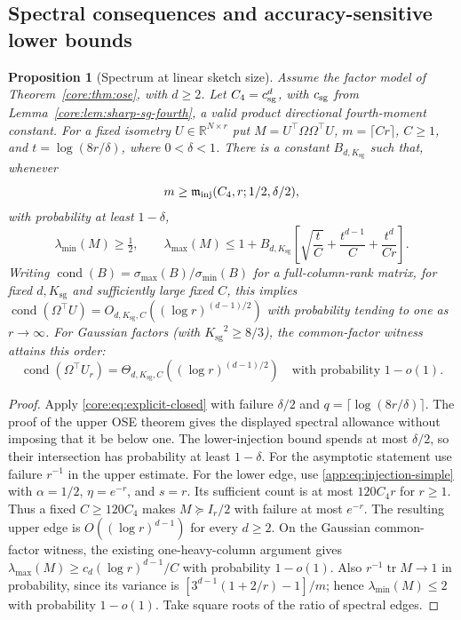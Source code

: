 \documentclass[11pt,a4paper]{article}
\newtheorem{proposition}[theorem]{Proposition}
\theoremstyle{definition}\newtheorem{definition}[theorem]{Definition}
\theoremstyle{remark}\newtheorem{remark}[theorem]{Remark}
\numberwithin{equation}{section}
\newcommand{\R}{\mathbb R}\newcommand{\E}{\mathbb E}\newcommand{\Pp}{\mathbb P}
\newcommand{\Ksg}{{K_{\mathrm{sg}}}}\newcommand{\Cfour}{{C_4}}
\DeclareMathOperator{\tr}{tr}\DeclareMathOperator{\rank}{rank}
\begin{document}
\subsection{Spectral consequences and accuracy-sensitive lower bounds}
\label{appendix:spectral-extensions}
\begin{proposition}[Spectrum at linear sketch size]\label{core:prop:conditioning}
Assume the factor model of Theorem~\ref{core:thm:ose}, with $d\ge2$.
Let $\Cfour=c_{\rm sg}^d$, with $c_{\rm sg}$ from
Lemma~\ref{core:lem:sharp-sg-fourth}, a valid product directional
fourth-moment constant. For a fixed isometry $U\in\R^{N\times r}$ put
$M=U^\top\Omega\Omega^\top U$, $m=\lceil Cr\rceil$, $C\ge1$, and
$t=\log(8r/\delta)$, where $0<\delta<1$.
There is a constant $B_{d,\Ksg}$ such that, whenever
\[
 m\ge\mathfrak m_{\rm inj}(\Cfour,r;1/2,\delta/2),
\]
with probability at least $1-\delta$,
\[
 \lambda_{\min}(M)\ge\tfrac12,
 \qquad
 \lambda_{\max}(M)\le1+B_{d,\Ksg}
 \left[\sqrt{\frac tC}+\frac{t^{d-1}}C+\frac{t^d}{Cr}\right].
\]
Writing $\operatorname{cond}(B)=\sigma_{\max}(B)/\sigma_{\min}(B)$ for a full-column-rank matrix,
for fixed $d,\Ksg$ and sufficiently large fixed $C$, this implies
$\operatorname{cond}(\Omega^\top U)=O_{d,\Ksg,C}((\log r)^{(d-1)/2})$
with probability tending to one as $r\to\infty$.
For Gaussian factors (with $\Ksg^2\ge8/3$), the common-factor witness
attains this order:
\[
 \operatorname{cond}(\Omega^\top U_r)
 =\Theta_{d,\Ksg,C}((\log r)^{(d-1)/2})
 \quad\text{with probability }1-o(1).
\]
\end{proposition}
\begin{proof}
Apply \eqref{core:eq:explicit-closed} with failure $\delta/2$ and
$q=\lceil\log(8r/\delta)\rceil$. The proof of the upper OSE theorem gives
the displayed spectral allowance without imposing that it be below one.
The lower-injection bound spends at most $\delta/2$, so their
intersection has probability at least $1-\delta$.
For the asymptotic statement use failure $r^{-1}$ in the upper estimate.
For the lower edge, use \eqref{app:eq:injection-simple} with
$\alpha=1/2$, $\eta=e^{-r}$, and $s=r$. Its sufficient count is
at most $120\Cfour r$ for $r\ge1$. Thus a fixed
$C\ge120\Cfour$ makes $M\succeq I_r/2$ with failure at most $e^{-r}$.
The resulting upper edge is $O((\log r)^{d-1})$ for every $d\ge2$.
On the Gaussian common-factor witness, the existing one-heavy-column
argument gives $\lambda_{\max}(M)\ge c_d(\log r)^{d-1}/C$ with
probability $1-o(1)$. Also $r^{-1}\tr M\to1$ in probability, since its
variance is $[3^{d-1}(1+2/r)-1]/m$; hence
$\lambda_{\min}(M)\le2$ with probability $1-o(1)$. Take square roots
of the ratio of spectral edges.
\end{proof}
\end{document}
